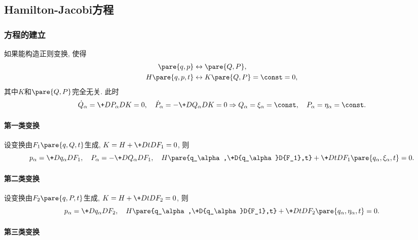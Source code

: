 \documentclass{ctexart}
\begin{document}


\subsection{Hamilton-Jacobi方程} %
\label{sub:hamilton_jacobi方程}

\subsubsection{方程的建立} %
\label{ssub:方程的建立}

如果能构造正则变换, 使得
\begin{align*}
    \pare{q,p} &\leftrightarrow \pare{Q,P}, \\
    H\pare{q,p,t} &\leftrightarrow K\pare{Q,P} = \const = 0,
\end{align*}
其中$K$和$\pare{Q,P}$完全无关. 此时
\[ \dot{Q}_\alpha = \+D{P_\alpha}DK = 0,\quad \dot{P}_\alpha = - \+D{Q_\alpha}DK = 0 \Rightarrow Q_\alpha = \xi_\alpha = \const,\quad P_\alpha = \eta_\alpha = \const. \]

\paragraph{第一类变换} %
\label{par:第一类变换}

设变换由$F_1\pare{q,Q,t}$生成, $K = H + \displaystyle \+DtD{F_1} = 0$, 则
\[ p_\alpha = \+D{q_\alpha}D{F_1},\quad P_\alpha = -\+D{Q_\alpha}D{F_1},\quad H\pare{q_\alpha,\+D{q_\alpha}D{F_1},t} + \+DtD{F_1\pare{q_\alpha,\xi_\alpha,t}} = 0. \]


\paragraph{第二类变换} %
\label{par:第二类变换}

设变换由$F_2\pare{q,P,t}$生成, $K = H + \displaystyle \+DtD{F_2} = 0$, 则
\[ p_\alpha = \+D{q_\alpha}D{F_2},\quad H\pare{q_\alpha,\+D{q_\alpha}D{F_1},t} + \+DtD{F_2\pare{q_\alpha,\eta_\alpha,t}} = 0. \]


\paragraph{第三类变换} %
\label{par:第三类变换}
\end{document}
